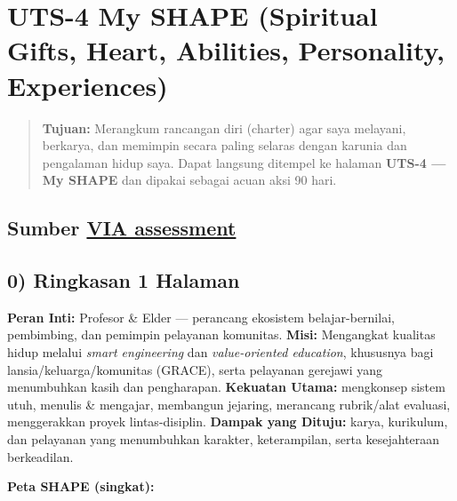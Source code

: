 \documentclass[
  letterpaper,
  DIV=11,
  numbers=noendperiod]{scrreprt}
\begin{document}

\chapter{UTS-4 My SHAPE (Spiritual Gifts, Heart, Abilities, Personality,
Experiences)}\label{uts-4-my-shape-spiritual-gifts-heart-abilities-personality-experiences}

\begin{quote}
\textbf{Tujuan:} Merangkum rancangan diri (charter) agar saya melayani,
berkarya, dan memimpin secara paling selaras dengan karunia dan
pengalaman hidup saya. Dapat langsung ditempel ke halaman \textbf{UTS-4
--- My SHAPE} dan dipakai sebagai acuan aksi 90 hari.
\end{quote}

\section{\texorpdfstring{Sumber
\href{StrengthsProfile-Armein-Langi.pdf}{VIA
assessment}}{Sumber VIA assessment}}\label{sumber-via-assessment}

\section{0) Ringkasan 1 Halaman}\label{ringkasan-1-halaman}

\textbf{Peran Inti:} Profesor \& Elder --- perancang ekosistem
belajar-bernilai, pembimbing, dan pemimpin pelayanan komunitas.
\textbf{Misi:} Mengangkat kualitas hidup melalui \emph{smart
engineering} dan \emph{value-oriented education}, khususnya bagi
lansia/keluarga/komunitas (GRACE), serta pelayanan gerejawi yang
menumbuhkan kasih dan pengharapan. \textbf{Kekuatan Utama:} mengkonsep
sistem utuh, menulis \& mengajar, membangun jejaring, merancang
rubrik/alat evaluasi, menggerakkan proyek lintas-disiplin.
\textbf{Dampak yang Dituju:} karya, kurikulum, dan pelayanan yang
menumbuhkan karakter, keterampilan, serta kesejahteraan berkeadilan.

\textbf{Peta SHAPE (singkat):}
\end{document}
